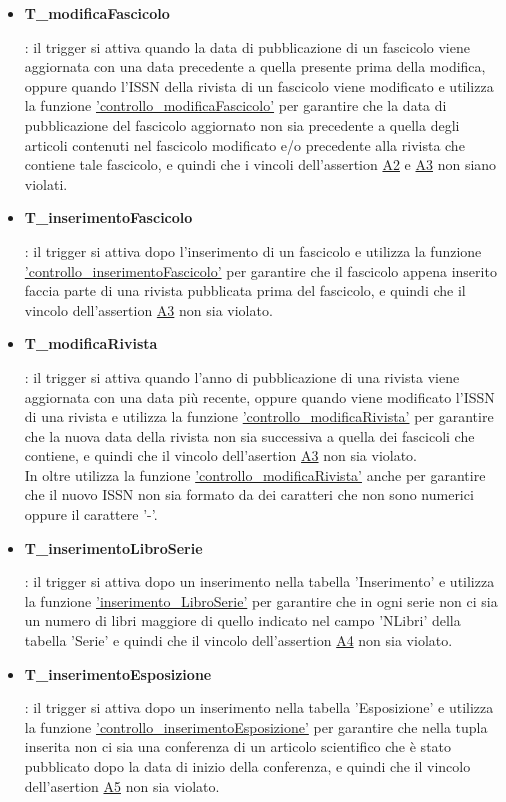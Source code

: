 \documentclass{article}
\begin{document}
\begin{itemize}
    \item \hypertarget{t6}{\textbf{T\_modificaFascicolo}}: il trigger si attiva quando la data di pubblicazione di un fascicolo viene aggiornata con una data precedente a quella presente prima della modifica, oppure quando l'ISSN della rivista di un fascicolo viene modificato e utilizza la funzione \hyperlink{f6}{'controllo\_modificaFascicolo'} per garantire che la data di pubblicazione del fascicolo aggiornato non sia precedente a quella degli articoli contenuti nel fascicolo modificato e/o precedente alla rivista che contiene tale fascicolo, e quindi che i vincoli dell'assertion \hyperlink{assertion2}{A2} e \hyperlink{assertion2}{A3} non siano violati.

    \item \hypertarget{t7}{\textbf{T\_inserimentoFascicolo}}: il trigger si attiva dopo l'inserimento di un fascicolo e utilizza la funzione \hyperlink{f7}{'controllo\_inserimentoFascicolo'} per garantire che il fascicolo appena inserito faccia parte di una rivista pubblicata prima del fascicolo, e quindi che il vincolo dell'assertion \hyperlink{assertion3}{A3} non sia violato.

    \item \hypertarget{t9}{\textbf{T\_modificaRivista}}: il trigger si attiva quando l'anno di pubblicazione di una rivista viene aggiornata con una data più recente, oppure quando viene modificato l'ISSN di una rivista e utilizza la funzione \hyperlink{f9}{'controllo\_modificaRivista'} per garantire che la nuova data della rivista non sia successiva a quella dei fascicoli che contiene, e quindi che il vincolo dell'asertion \hyperlink{assertion3}{A3} non sia violato.\\
     In oltre utilizza la funzione \hyperlink{f9}{'controllo\_modificaRivista'} anche per garantire che il nuovo ISSN non sia formato da dei caratteri che non sono numerici oppure il carattere '-'.

    \item \hypertarget{t10}{\textbf{T\_inserimentoLibroSerie}}: il trigger si attiva dopo un inserimento nella tabella 'Inserimento' e utilizza la funzione \hyperlink{f10}{'inserimento\_LibroSerie'} per garantire che in ogni serie non ci sia un numero di libri maggiore di quello indicato nel campo 'NLibri' della tabella 'Serie' e quindi che il vincolo dell'assertion \hyperlink{assertion4}{A4} non sia violato.

   \item \hypertarget{t11}{\textbf{T\_inserimentoEsposizione}}: il trigger si attiva dopo un inserimento nella tabella 'Esposizione' e utilizza la funzione \hyperlink{f11}{'controllo\_inserimentoEsposizione'} per garantire che nella tupla inserita non ci sia una conferenza di un articolo scientifico che è stato pubblicato dopo la data di inizio della conferenza, e quindi che il vincolo dell'asertion  \hyperlink{assertion5}{A5} non sia violato.


\end{itemize}
\end{document}
